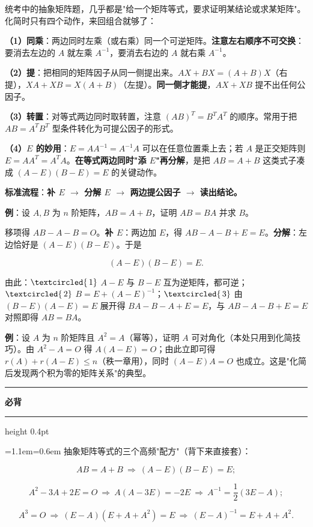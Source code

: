 \documentclass[11pt,openany,UTF8]{ctexbook}
\newcommand{\circled}[1]{\textcircled{\scriptsize\,#1}}
\newcommand{\callouthead}[2]{%
  \par\addvspace{7pt}\noindent
  {\color{#1}\rule[-0.15em]{3pt}{1.05em}}\hspace{0.5em}%
  {\bfseries\color{#1}#2}\par\nobreak\vspace{-0.35em}%
  {\color{rulesep}\hrule height 0.4pt}\nobreak\vspace{0.45em}%
  \begingroup\small\setlength{\parindent}{0pt}%
  \leftskip=1.1em\rightskip=0.6em\noindent\ignorespaces}
\newcommand{\calloutend}{\par\endgroup\addvspace{7pt}}
\newenvironment{callkey}[1]{\callouthead{keybar}{#1}}{\calloutend}
\begin{document}
统考中的抽象矩阵题，几乎都是"给一个矩阵等式，要求证明某结论或求某矩阵"。化简时只有四个动作，来回组合就够了：

\textbf{（1）同乘}：两边同时左乘（或右乘）同一个可逆矩阵。\textbf{注意左右顺序不可交换}：要消去左边的 $A$ 就左乘 $A^{-1}$，要消去右边的 $A$ 就右乘 $A^{-1}$。

\textbf{（2）提}：把相同的矩阵因子从同一侧提出来。$AX+BX=(A+B)X$（右提），$XA+XB=X(A+B)$（左提）。\textbf{同一侧才能提}，$AX+XB$ 提不出任何公因子。

\textbf{（3）转置}：对等式两边同时取转置，注意 $(AB)^T=B^TA^T$ 的顺序。常用于把 $AB=A^TB^T$ 型条件转化为可提公因子的形式。

\textbf{（4）$E$ 的妙用}：$E=AA^{-1}=A^{-1}A$ 可以在任意位置乘上去；若 $A$ 是正交矩阵则 $E=AA^T=A^TA$。\textbf{在等式两边同时"添 $E$"再分解}，是把 $AB=A+B$ 这类式子凑成 $(A-E)(B-E)=E$ 的关键动作。

\textbf{标准流程}：\textbf{补 $E$ $\to$ 分解 $E$ $\to$ 两边提公因子 $\to$ 读出结论。}

\textbf{例}：设 $A,B$ 为 $n$ 阶矩阵，$AB=A+B$，证明 $AB=BA$ 并求 $B$。

移项得 $AB-A-B=O$。\textbf{补 $E$}：两边加 $E$，得 $AB-A-B+E=E$。\textbf{分解}：左边恰好是 $(A-E)(B-E)$。于是

\[(A-E)(B-E)=E .\]

由此：$\circled{1}$ $A-E$ 与 $B-E$ 互为逆矩阵，都可逆；$\circled{2}$ $B=E+(A-E)^{-1}$；$\circled{3}$ 由 $(B-E)(A-E)=E$ 展开得 $BA-B-A+E=E$，与 $AB-A-B+E=E$ 对照即得 $AB=BA$。

\textbf{例}：设 $A$ 为 $n$ 阶矩阵且 $A^2=A$（幂等），证明 $A$ 可对角化（本处只用到化简技巧）。由 $A^2-A=O$ 得 $A(A-E)=O$；由此立即可得 $r(A)+r(A-E)\le n$（秩一章用），同时 $(A-E)A=O$ 也成立。这是"化简后发现两个积为零的矩阵关系"的典型。

\begin{callkey}{必背}
抽象矩阵等式的三个高频"配方"（背下来直接套）：

\[AB=A+B\ \Longrightarrow\ (A-E)(B-E)=E;\]

\[A^2-3A+2E=O\ \Longrightarrow\ A(A-3E)=-2E\ \Longrightarrow\ A^{-1}=\frac{1}{2}(3E-A);\]

\[A^3=O\ \Longrightarrow\ (E-A)(E+A+A^2)=E\ \Longrightarrow\ (E-A)^{-1}=E+A+A^2 .\]

\end{callkey}
\end{document}
